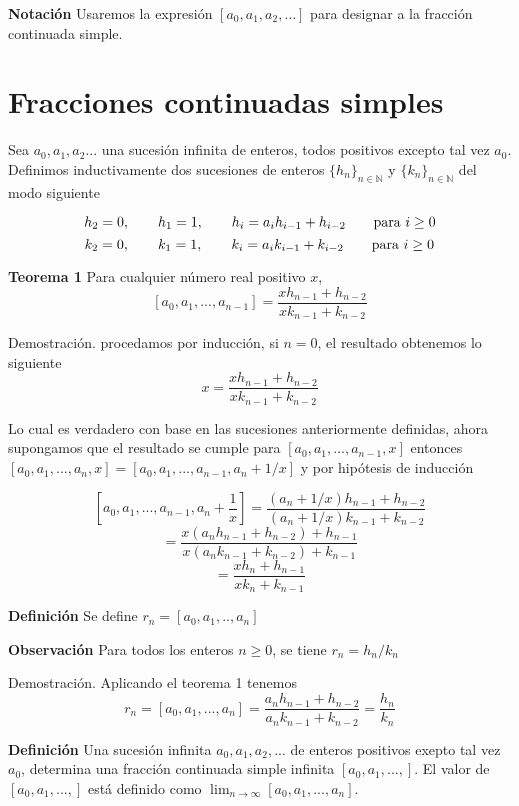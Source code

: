 \documentclass[11pt, article]{article}
\begin{document}
    \textbf{Notación} Usaremos la expresión $[a_0,a_1,a_2, \dots]$ para designar a la fracción continuada simple.
    
\section*{Fracciones continuadas simples}
    
    
    Sea $a_0,a_1,a_2...$ una sucesión infinita de enteros, todos positivos excepto tal vez $a_0$. Definimos inductivamente dos sucesiones de enteros $\{h_n\}_{n\in\mathbb{N}}$ y $\{k_n\}_{n\in\mathbb{N}}$ del modo siguiente 
    
        \[
        h_2=0, \qquad h_1 =1, \qquad h_i=a_ih_{i-1} + h_{i-2} \qquad \textnormal{para } i\geq 0
        \]
        \[
        k_2=0, \qquad k_1 =1, \qquad k_i=a_ik_{i-1} + k_{i-2} \qquad \textnormal{para } i\geq 0
        \]
    
    \textbf{Teorema 1} Para cualquier número real positivo $x$,
        \[
        [a_0,a_1,...,a_{n-1}]=\dfrac{xh_{n-1}+h_{n-2}}{xk_{n-1}+k_{n-2}}
        \]
        
    Demostración. procedamos por inducción, si $n=0$, el resultado obtenemos lo siguiente
        \[
        x=\dfrac{xh_{n-1}+h_{n-2}}{xk_{n-1}+k_{n-2}}
        \]
        
    Lo cual es verdadero con base en las sucesiones anteriormente definidas, ahora supongamos que el resultado se cumple para $[a_0,a_1,...,a_{n-1},x]$ entonces $[a_0,a_1,...,a_n,x]=[a_0,a_1,...,a_{n-1},a_n + 1/x]$ y por hipótesis de inducción
    
        \[
        [a_0,a_1,...,a_{n-1},a_n + \dfrac{1}{x}]
            =\dfrac{(a_n+1/x)h_{n-1}+h_{n-2}}{(a_n+1/x)k_{n-1}+k_{n-2}}
            \]
            \[
            =\dfrac{x(a_nh_{n-1}+h_{n-2})+h_{n-1}}{x(a_nk_{n-1}+k_{n-2})+k_{n-1}}
            \]
            \[
            =\dfrac{xh_n+h_{n-1}}{xk_n+k_{n-1}}
        \]
        
    \textbf{Definición} Se define $r_n=[a_0,a_1,..,a_n]$
    
    \textbf{Observación} Para todos los enteros $n \geq 0$, se tiene $r_n=h_n/k_n$
    
    Demostración. Aplicando el teorema 1 tenemos
    \[
    r_n=[a_0,a_1,...,a_n]=\dfrac{a_nh_{n-1}+h_{n-2}}{a_nk_{n-1}+k_{n-2}}=\dfrac{h_n}{k_n}
    \]
    
    \textbf{Definición}  Una sucesión infinita $a_0, a_1, a_2,...$ de enteros positivos exepto tal vez $a_0$, determina una fracción continuada simple infinita $[a_0, a_1, ..., ]$. El valor de $[a_0, a_1, ..., ]$ está definido como $\lim_{n\to\infty}[a_0, a_1, ..., a_n]$.
    
\end{document}
